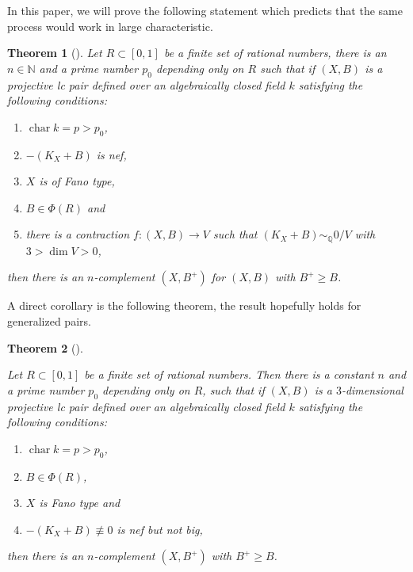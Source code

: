 \documentclass[letterpaper,reqno,12pt]{amsart}
\DeclareMathOperator{\chara}{char}
\numberwithin{equation}{section}
\theoremstyle{plain}
\newtheorem{theorem}{Theorem}[section]
\begin{document}
In this paper, we will prove the following statement which predicts that the same process would work in large characteristic.
\begin{theorem}[]
\label{fibcomp1}
    Let $R\subset [0,1]$ be a finite set of rational numbers, there is an $n\in\mathbb N$ and a prime number $p_0$ depending only on $R$ such that if $(X,B)$ is a projective lc pair defined over an algebraically closed field $k$ satisfying the following conditions:
    \begin{enumerate}
        \item $\chara k=p>p_0$,
        \item $-(K_X+B)$ is nef,
        \item $X$ is of Fano type,
        \item $B\in \Phi(R)$ and
        \item there is a contraction $f:(X,B)\to V$ such that $(K_X+B)\sim_{\mathbb Q} 0/V$ with $3>\dim V>0$,
    \end{enumerate}
    then there is an $n$-complement $(X,B^+)$ for $(X,B)$ with $B^+\geq B$.
\end{theorem}
A direct corollary is the following theorem, the result hopefully holds for generalized pairs.
\begin{theorem}[]
\label{Main}
       

    Let $R\subset [0,1]$ be a finite set of rational numbers. Then there is a constant $n$ and a prime number $p_0$ depending only on $R$, such that if $(X,B)$ is a $3$-dimensional projective lc pair defined over an algebraically closed field $k$ satisfying the following conditions:
    \begin{enumerate}
        \item $\chara k=p>p_0$,
        \item $B\in \Phi(R)$,
        \item $X$ is Fano type and
        \item $-(K_X+B)\not\equiv0$ is nef but not big,
    \end{enumerate}
    then there is an $n$-complement $(X,B^+)$ with $B^+\geq B$.
\end{theorem}
\end{document}
